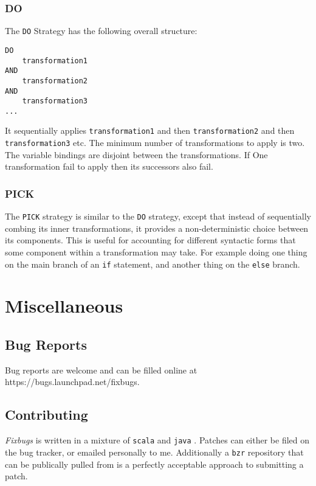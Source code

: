 \documentclass[final,twoside,12pt]{article}
\newcommand{\fixbugs}{{\emph{Fixbugs} }}
\newcommand{\java}{{\tt java} }
\begin{document}
\subsubsection{DO}

The {\tt DO} Strategy has the following overall structure:

\begin{lstlisting}
DO
    transformation1
AND
    transformation2
AND
    transformation3
...
\end{lstlisting}

It sequentially applies {\tt transformation1} and then {\tt transformation2} and then {\tt transformation3} etc.
The minimum number of transformations to apply is two.  The variable bindings are disjoint between the transformations.
If One transformation fail to apply then its successors also fail.

\subsubsection{PICK}

The {\tt PICK} strategy is similar to the {\tt DO} strategy, except that instead of sequentially combing its inner
transformations, it provides a non-deterministic choice between its components.  This is useful for accounting for different
syntactic forms that some component within a transformation may take.  For example doing one thing on the main branch of
an {\tt if} statement, and another thing on the {\tt else} branch.


\section{Miscellaneous}

\subsection{Bug Reports}

Bug reports are welcome and can be filled online at https://bugs.launchpad.net/fixbugs.

\subsection{Contributing}

\fixbugs is written in a mixture of {\tt scala} and \java.
Patches can either be filed on the bug tracker, or emailed personally to me.  Additionally
a {\tt bzr} repository that can be publically pulled from is a perfectly acceptable approach
to submitting a patch.

\end{document}
